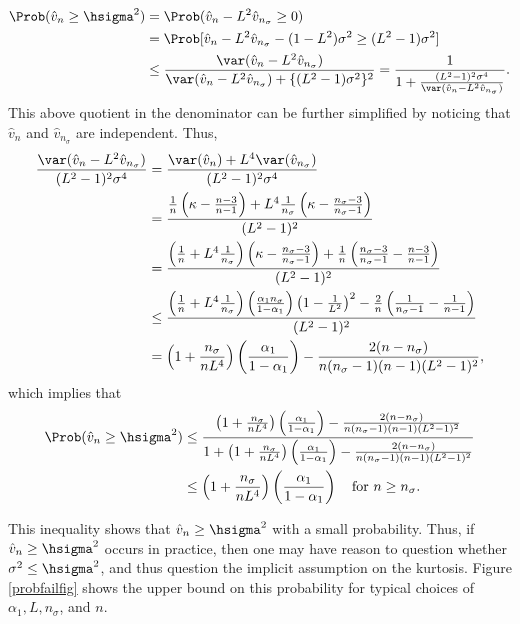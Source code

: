 \documentclass[graybox]{svmult}
\newcommand{\hv}{\hat{v}}
\begin{document}
\begin{align*}
\Prob(\hv_n \ge \hsigma^2) & = \Prob(\hv_n - L^2 \hv_{n_{\sigma}}\ge 0) \\
& = \Prob[\hv_n - L^2 \hv_{n_{\sigma}} - (1 - L^2) \sigma^2 \ge (L^2 - 1) \sigma^2] \\
& \le \frac{\var(\hv_n - L^2 \hv_{n_{\sigma}})}{\var(\hv_n - L^2 \hv_{n_{\sigma}}) + \{(L^2 - 1) \sigma^2\}^2} = \frac{1}{1 + \frac{(L^2 - 1)^2 \sigma^4}{\var(\hv_n - L^2 \hv_{n_{\sigma}})}}.
\end{align*}
This above quotient in the denominator can be further simplified by noticing that $\hv_n$ and $\hv_{n_{\sigma}}$ are independent.  Thus,
\begin{align*}
\frac{\var(\hv_n - L^2 \hv_{n_{\sigma}})}{(L^2 - 1)^2 \sigma^4}
& = \frac{\var(\hv_n) + L^4 \var(\hv_{n_{\sigma}})}{(L^2 - 1)^2 \sigma^4} \\
& = \frac{\frac{1}{n} \left ( \kappa  - \frac{n-3}{n-1} \right) + L^4 \frac{1}{n_{\sigma}} \left ( \kappa  - \frac{n_{\sigma}-3}{n_{\sigma}-1} \right)}{(L^2 - 1)^2} \\
& = \frac{\left(\frac{1}{n} + L^4 \frac{1}{n_{\sigma}} \right)\left ( \kappa  - \frac{n_{\sigma}-3}{n_{\sigma}-1} \right) + \frac{1}{n} \left ( \frac{n_{\sigma}-3}{n_{\sigma}-1}  - \frac{n-3}{n-1} \right)}{(L^2 - 1)^2} \\
& \le \frac{\left(\frac{1}{n} + L^4 \frac{1}{n_{\sigma}} \right) \left(\frac{ \alpha_1 n_{\sigma}}{1-\alpha_1}\right) \left(1 - \frac{1}{L^2}\right)^2 - \frac{2}{n} \left ( \frac{1}{n_{\sigma}-1}  - \frac{1}{n-1} \right)}{(L^2 - 1)^2} \\
& = \left(1 + \frac{n_{\sigma}}{nL^4} \right) \left(\frac{ \alpha_1}{1-\alpha_1}\right)  - \frac{2(n-n_{\sigma})}{n(n_{\sigma}-1)(n-1)(L^2 - 1)^2},
\end{align*}
which implies that 
\begin{align} \label{probfail}
\Prob(\hv_n \ge \hsigma^2) 
 & \le \frac{\left(1 + \frac{n_{\sigma}}{nL^4} \right) \left(\frac{ \alpha_1}{1-\alpha_1}\right)  - \frac{2(n-n_{\sigma})} {n(n_{\sigma}-1)(n-1)(L^2 - 1)^2}} {1+\left(1 + \frac{n_{\sigma}}{nL^4} \right) \left(\frac{ \alpha_1}{1-\alpha_1}\right)  - \frac{2(n-n_{\sigma})}{n(n_{\sigma}-1)(n-1)(L^2 - 1)^2}}\\
\nonumber & \le \left(1 + \frac{n_{\sigma}}{nL^4} \right) \left(\frac{ \alpha_1}{1-\alpha_1}\right) \quad \text{for } n \ge n_{\sigma}.
\end{align}

This inequality shows that $\hv_n \ge \hsigma^2$ with a small probability.  Thus, if $\hv_n \ge \hsigma^2$ occurs in practice, then one may have reason to question whether $\sigma^2 \le \hsigma^2$, and thus question the implicit assumption on the kurtosis. Figure \ref{probfailfig} shows the upper bound on this probability for typical choices of $\alpha_1, L, n_{\sigma}$, and $n$.
\end{document}
